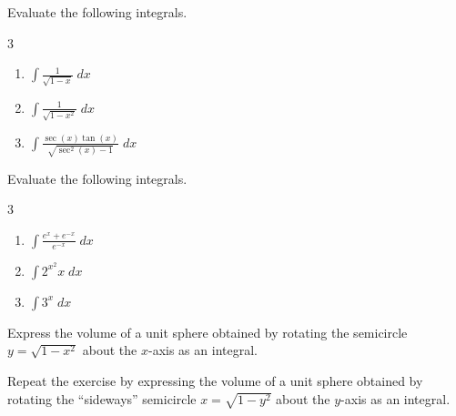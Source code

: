 \documentclass[../main.tex]{subfiles}
\begin{document}
\begin{exercise}
  Evaluate the following integrals.

  \begin{multicols}{3}
    \begin{enumerate}[wide, label=(\alph*)]
      \item \(\int \frac{1}{\sqrt{1 - x}} \;dx\)
      \item \(\int \frac{1}{\sqrt{1 - x^{2}}} \;dx\)
      \item \(\int \frac{\sec(x)\tan(x)}{\sqrt{\sec^{2}(x) - 1}} \;dx\) 
    \end{enumerate}
  \end{multicols}

\end{exercise}
\clearpage

\begin{exercise}
  Evaluate the following integrals.

  \begin{multicols}{3}
    \begin{enumerate}[wide, label=(\alph*)]
      \item \(\int \frac{e^{x} + e^{-x}}{e^{-x}} \;dx\)
      \item \(\int 2^{x^{2}} x \;dx\)
      \item \(\int 3^{x} \;dx\)
    \end{enumerate}
  \end{multicols}

\end{exercise}
\clearpage

\begin{exercise}
  Express the volume of a unit sphere obtained by rotating the semicircle \(y = \sqrt{1 - x^{2}}\) about the \(x\)-axis as an integral.

  Repeat the exercise by expressing the volume of a unit sphere obtained by rotating the ``sideways'' semicircle \(x = \sqrt{1 - y^{2}}\) about the \(y\)-axis as an integral. 

\end{exercise}
\clearpage
\end{document}
